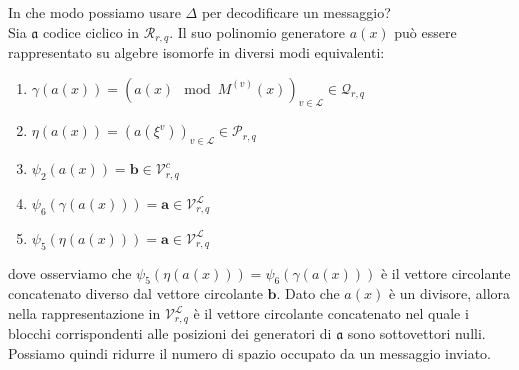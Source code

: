 In che modo possiamo usare $\Delta$ per decodificare un messaggio? \\
Sia $\mathfrak{a}$ codice ciclico in $\mathcal{R}_{r,q}$. Il suo polinomio generatore $a(x)$ può essere rappresentato su algebre isomorfe in diversi modi equivalenti:
\begin{enumerate}
   \item $\gamma (a(x)) = (a(x) \mod{M^{(v)} (x)})_{v \in \mathscr{L} } \in \mathcal{Q}_{r,q}$
   \item $\eta (a(x)) =     (a(\xi^{v}))_{v \in \mathscr{L} } \in \mathcal{P}_{r,q} $
   \item $\psi_{2}(a(x)) = \mathbf{b} \in \mathcal{V}_{r, q}^{c}$
   \item $\psi_{6}(\gamma (a(x))) = \mathbf{a} \in \mathcal{V}_{r, q}^{\mathscr{L}}$
   \item $ \psi_{5}(\eta (a(x))) = \mathbf{a} \in \mathcal{V}_{r, q}^{\mathscr{L}}$
\end{enumerate}
dove osserviamo che $\psi_{5}(\eta (a(x))) = \psi_{6}(\gamma (a(x)))$ è il vettore circolante concatenato diverso dal vettore circolante $\mathbf{b}$. Dato che $a(x)$ è un divisore, allora nella rappresentazione in $\mathcal{V}_{r, q}^{\mathscr{L}}$ è il vettore circolante concatenato nel quale i blocchi corrispondenti alle posizioni dei generatori di $\mathfrak{a}$ sono sottovettori nulli. Possiamo quindi ridurre il numero di spazio occupato da un messaggio inviato.

